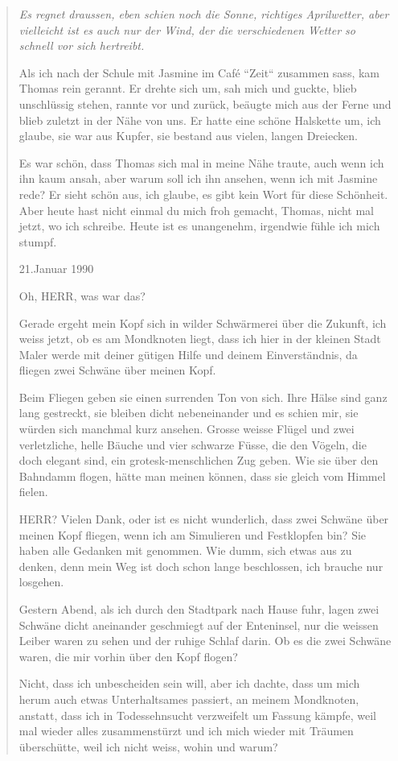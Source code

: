 \documentclass[10pt,titlepage,a5paper]{book}
\newenvironment{tg}{\begin{quote}\em}{\end{quote}}
\begin{document}
\begin{tg}
Es regnet draussen, eben schien noch die Sonne, richtiges Aprilwetter, aber vielleicht ist es auch nur der Wind, der die verschiedenen Wetter so schnell vor sich hertreibt.

Als ich nach der Schule mit Jasmine im Café ``Zeit`` zusammen sass, kam Thomas rein gerannt. Er drehte sich um, sah mich und guckte, blieb unschlüssig stehen, rannte vor und zurück, beäugte mich aus der Ferne und blieb zuletzt in der Nähe von uns. Er hatte eine schöne Halskette um, ich glaube, sie war aus Kupfer, sie bestand aus vielen, langen Dreiecken.

Es war schön, dass Thomas sich mal in meine Nähe traute, auch wenn ich ihn kaum ansah, aber warum soll ich ihn ansehen, wenn ich mit Jasmine rede? Er sieht schön aus, ich glaube, es gibt kein Wort für diese Schönheit.
Aber heute hast nicht einmal du mich froh gemacht, Thomas, nicht mal jetzt, wo ich schreibe. Heute ist es unangenehm, irgendwie fühle ich mich stumpf.

21.Januar 1990

Oh, HERR, was war das?

Gerade ergeht mein Kopf sich in wilder Schwärmerei über die Zukunft, ich weiss jetzt, ob es am Mondknoten liegt, dass ich hier in der kleinen Stadt Maler werde mit deiner gütigen Hilfe und deinem Einverständnis, da fliegen zwei Schwäne über meinen Kopf.

Beim Fliegen geben sie einen surrenden Ton von sich. Ihre Hälse sind ganz lang gestreckt, sie bleiben dicht nebeneinander und es schien mir, sie würden sich manchmal kurz ansehen. Grosse weisse Flügel und zwei verletzliche, helle Bäuche und vier schwarze Füsse, die den Vögeln, die doch elegant sind, ein grotesk-menschlichen Zug geben. Wie sie über den Bahndamm flogen, hätte man meinen können, dass sie gleich vom Himmel fielen.

HERR? Vielen Dank, oder ist es nicht wunderlich, dass zwei Schwäne über meinen Kopf fliegen, wenn ich am Simulieren und Festklopfen bin? Sie haben alle Gedanken mit genommen. Wie dumm, sich etwas aus zu denken, denn mein Weg ist doch schon lange beschlossen, ich brauche nur losgehen.

Gestern Abend, als ich durch den Stadtpark nach Hause fuhr, lagen zwei Schwäne dicht aneinander geschmiegt auf der Enteninsel, nur die weissen Leiber waren zu sehen und der ruhige Schlaf darin. Ob es die zwei Schwäne waren, die mir vorhin über den Kopf flogen?

Nicht, dass ich unbescheiden sein will, aber ich dachte, dass um mich herum auch etwas Unterhaltsames passiert, an meinem Mondknoten, anstatt, dass ich in Todessehnsucht verzweifelt um Fassung kämpfe, weil mal wieder alles zusammenstürzt und ich mich wieder mit Träumen überschütte, weil ich nicht weiss, wohin und warum?


\end{tg}
\end{document}
